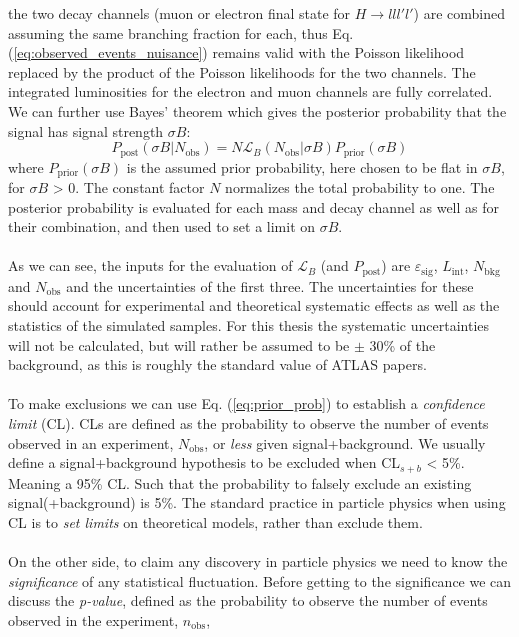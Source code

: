 \documentclass[12pt, a4paper]{book}
\begin{document}
the two decay channels (muon or electron final state for $H\rightarrow lll'l'$) are combined assuming the same branching fraction for each, thus Eq. (\ref{eq:observed_events_nuisance}) remains valid with the Poisson likelihood replaced by the product of the Poisson likelihoods for the two channels. 
The integrated luminosities for the electron and muon channels are fully correlated. We can further use Bayes' theorem which gives the posterior probability that the signal has signal strength $\sigma B$:
\begin{equation}\label{eq:prior_prob}
    P_{\text{post}}(\sigma B\vert N_{\text{obs}}) = N \mathcal{L}_B (N_{\text{obs}}\vert\sigma B) P_{\text{prior}}(\sigma B)
\end{equation}
where $P_{\text{prior}}(\sigma B)$ is the assumed prior probability, here chosen to be flat in $\sigma B$, for $\sigma B$ > 0. The constant factor $N$ normalizes the total probability to one. The posterior probability is evaluated for each mass and decay channel as well as for their 
combination, and then used to set a limit on $\sigma B$.\\
\\As we can see, the inputs for the evaluation of $\mathcal{L}_B$ (and $P_{\text{post}}$) are $\varepsilon_{\text{sig}}$, $L_{\text{int}}$, $N_{\text{bkg}}$ and $N_{\text{obs}}$ and the uncertainties of the first three. The uncertainties for these should account for experimental 
and theoretical systematic effects as well as the statistics of the simulated samples. For this thesis the systematic uncertainties will not be calculated, but will rather be assumed to be $\pm$ 30\% of the background, as this is roughly the standard value of ATLAS papers.\\
\\To make exclusions we can use Eq. (\ref{eq:prior_prob}) to establish a \textit{confidence limit} (CL). CLs are defined as the probability to observe the number of events observed in an experiment, $N_{\text{obs}}$, or \textit{less} given signal+background. We usually define a signal+background 
hypothesis to be excluded when CL$_{s+b}$ < 5\%. Meaning a 95\% CL. Such that the probability to falsely exclude an existing signal(+background) is 5\%. The standard practice in particle physics when using CL is to \textit{set limits} on theoretical models, rather than exclude them.\\
\\On the other side, to claim any discovery in particle physics we need to know the \textit{significance} of any statistical fluctuation. Before getting to the significance we can discuss the \textit{p-value}, defined as the probability to observe the number of events observed in the experiment, $n_{\text{obs}}$, 
\end{document}

